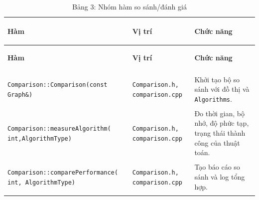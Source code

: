 \documentclass[14pt,a4paper]{report}
\begin{document}
\renewcommand{\arraystretch}{1.15}
\setlength{\tabcolsep}{6pt}

\begin{longtable}{|>{\bfseries\raggedright\arraybackslash}p{}|
                   >{\bfseries\raggedright\arraybackslash}p{2.8cm}|
                   >{\raggedright\arraybackslash}p{}|}
\caption{Bảng 3: Nhóm hàm so sánh/đánh giá}\\
\hline
\rowcolor{headergray}
\color{white}\textbf{Hàm} & \color{white}\textbf{Vị trí} & \color{white}\textbf{Chức năng} \\
\hline
\endfirsthead

\hline
\rowcolor{headergray}
\color{white}\textbf{Hàm} & \color{white}\textbf{Vị trí} & \color{white}\textbf{Chức năng} \\
\hline
\endhead

\hline
\endfoot

\hline
\endlastfoot

\texttt{Comparison::Comparison(const Graph\&)} &
\texttt{Comparison.h, comparison.cpp} &
Khởi tạo bộ so sánh với đồ thị và \texttt{Algorithms}.\\ \hline

\texttt{Comparison::measureAlgorithm( int,AlgorithmType)} &
\texttt{Comparison.h, comparison.cpp} &
Đo thời gian, bộ nhớ, độ phức tạp, trạng thái thành công của thuật toán.\\ \hline

\texttt{Comparison::comparePerformance( int, AlgorithmType)} &
\texttt{Comparison.h, comparison.cpp} &
Tạo báo cáo so sánh và log tổng hợp.\\ \hline

\end{longtable}


\renewcommand{\arraystretch}{1.15}
\setlength{\tabcolsep}{6pt}
\end{document}
